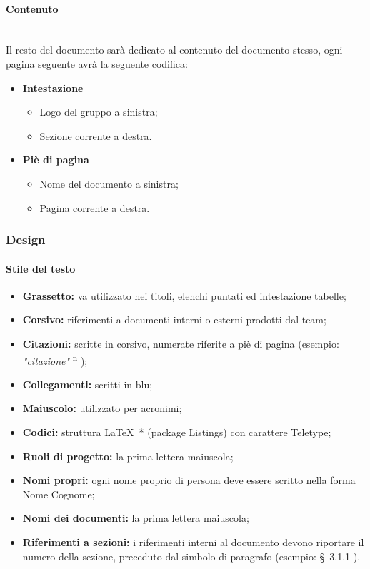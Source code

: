 \documentclass[11pt,a4paper]{article}
\begin{document}
	\paragraph{Contenuto}
	\noindent \\ 
	Il resto del documento sarà dedicato al contenuto del documento stesso, ogni pagina seguente avrà la seguente codifica:
	\begin{itemize}
		\item \textbf{Intestazione}
		\begin{itemize}
			\item Logo del gruppo a sinistra;
			\item Sezione corrente a destra.
		\end{itemize}
	
	\item \textbf{Piè di pagina} 
	\begin{itemize}
	\item Nome del documento a sinistra;
	\item Pagina corrente a destra.
	\end{itemize}
\end{itemize}
	
	\subsubsection{Design}
	
	\paragraph{Stile del testo}
	
	\noindent   
	\begin{itemize}
		\item \textbf{Grassetto:} va utilizzato nei titoli, elenchi puntati ed intestazione tabelle;
		\item \textbf{Corsivo:} riferimenti a documenti interni o esterni prodotti dal team;
		\item \textbf{Citazioni:} scritte in corsivo, numerate riferite a piè di pagina (esempio: \textit{"citazione"} \textsuperscript{n} );
		\item \textbf{Collegamenti:} scritti in blu;
		\item \textbf{Maiuscolo:} utilizzato per acronimi;
		\item \textbf{Codici:} struttura \LaTeX\ * (package Listings) con carattere Teletype;
		\item \textbf{Ruoli di progetto:} la prima lettera maiuscola;
		\item \textbf{Nomi propri:} ogni nome proprio di persona deve essere scritto nella forma Nome Cognome;
		\item \textbf{Nomi dei documenti:} la prima lettera maiuscola;
		\item \textbf{Riferimenti a sezioni:} i riferimenti interni al documento devono riportare il numero della sezione, preceduto dal simbolo di paragrafo (esempio: \S\ {3.1.1} ).
		
	\end{itemize}
\end{document}
